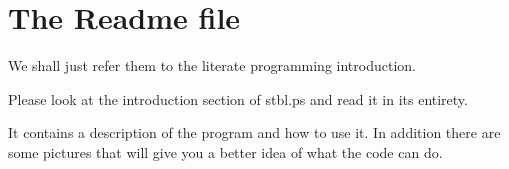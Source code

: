 \section{The Readme file}
\label{sec:readme}
We shall just refer them to the literate programming introduction.

\nwenddocs{}\endmoddef
Please look at the introduction section of stbl.ps and read it in its
entirety. 

It contains a description of the program and how to use it. In
addition there are some pictures that will give you a better idea of
what the code can do.
\nwendcode{}


